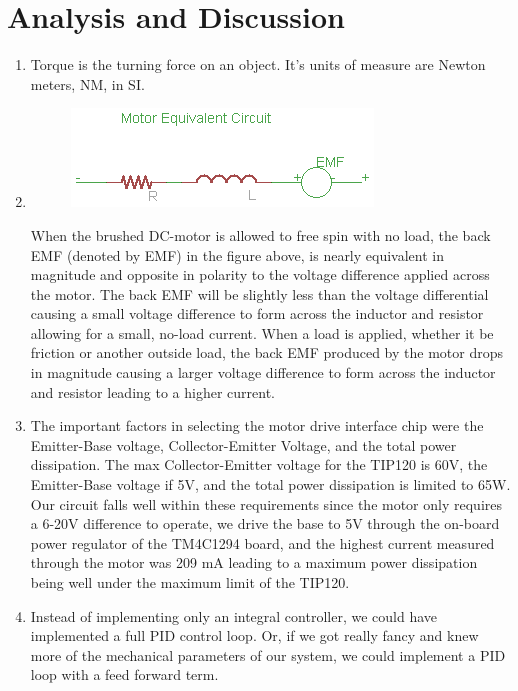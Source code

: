 \documentclass{article}
\begin{document}
\section{Analysis and Discussion}
	\begin{enumerate}
		\item %
			Torque is the turning force on an object. It's units of measure are Newton meters, NM, in SI.
		\item %
			\begin{figure}[h]
				\includegraphics[keepaspectratio, width=\textwidth]{Lab4Graphics/motorCircuit.png}
			\end{figure}
			When the brushed DC-motor is allowed to free spin with no load, the back EMF (denoted by EMF) in the figure above, is nearly equivalent in magnitude and opposite in polarity to the voltage difference applied across the motor. The back EMF will be slightly less than the voltage differential causing a small voltage difference to form across the inductor and resistor allowing for a small, no-load current. When a load is applied, whether it be friction or another outside load, the back EMF produced by the motor drops in magnitude causing a larger voltage difference to form across the inductor and resistor leading to a higher current.
		\item %
			The important factors in selecting the motor drive interface chip were the Emitter-Base voltage, Collector-Emitter Voltage, and the total power dissipation. The max Collector-Emitter voltage for the TIP120 is 60V, the Emitter-Base voltage if 5V, and the total power dissipation is limited to 65W. Our circuit falls well within these requirements since the motor only requires a 6-20V difference to operate, we drive the base to 5V through the on-board power regulator of the TM4C1294 board, and the highest current measured through the motor was 209 mA leading to a maximum power dissipation being well under the maximum limit of the TIP120.
		\item %
			Instead of implementing only an integral controller, we could have implemented a full PID control loop. Or, if we got really fancy and knew more of the mechanical parameters of our system, we could implement a PID loop with a feed forward term.\\

\end{enumerate}
\end{document}
